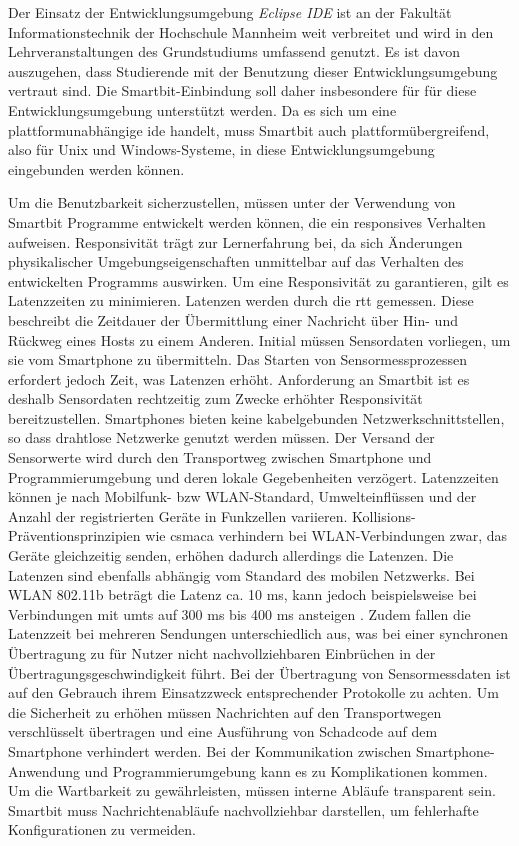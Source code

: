 \documentclass[11pt,a4paper]{report}
\begin{document}
Der Einsatz der Entwicklungsumgebung \textit{Eclipse IDE} \cite{eclipse-ide} ist an der Fakultät Informationstechnik der Hochschule Mannheim weit verbreitet und wird in den Lehrveranstaltungen des Grundstudiums umfassend genutzt.
Es ist davon auszugehen, dass Studierende mit der Benutzung dieser Entwicklungsumgebung vertraut sind.
Die Smartbit-Einbindung soll daher insbesondere für für diese Entwicklungsumgebung unterstützt werden.
Da es sich um eine plattformunabhängige \acrfull{ide} handelt, muss Smartbit auch plattformübergreifend, also für Unix und Windows-Systeme, in diese Entwicklungsumgebung eingebunden werden können.

Um die Benutzbarkeit sicherzustellen, müssen unter der Verwendung von Smartbit Programme entwickelt werden können, die ein responsives Verhalten aufweisen.
Responsivität trägt zur Lernerfahrung bei, da sich Änderungen physikalischer Umgebungseigenschaften unmittelbar auf das Verhalten des entwickelten Programms auswirken.
Um eine Responsivität zu garantieren, gilt es Latenzzeiten zu minimieren.
Latenzen werden durch die \acrfull{rtt} gemessen.
Diese beschreibt die Zeitdauer der Übermittlung einer Nachricht über Hin- und Rückweg eines Hosts zu einem Anderen.
Initial müssen Sensordaten vorliegen, um sie vom Smartphone zu übermitteln.
Das Starten von Sensormessprozessen erfordert jedoch Zeit, was Latenzen erhöht.
Anforderung an Smartbit ist es deshalb Sensordaten rechtzeitig zum Zwecke erhöhter Responsivität bereitzustellen. 
Smartphones bieten keine kabelgebunden Netzwerkschnittstellen, so dass drahtlose Netzwerke genutzt werden müssen.
Der Versand der Sensorwerte wird durch den Transportweg zwischen Smartphone und Programmierumgebung und deren lokale Gegebenheiten verzögert.
Latenzzeiten können je nach Mobilfunk- bzw WLAN-Standard, Umwelteinflüssen und der Anzahl der registrierten Geräte in Funkzellen variieren.
Kollisions-Präventionsprinzipien wie \acrfull{csmaca} verhindern bei WLAN-Verbindungen zwar, das Geräte gleichzeitig senden, erhöhen dadurch allerdings die Latenzen.
Die Latenzen sind ebenfalls abhängig vom Standard des mobilen Netzwerks.
Bei WLAN 802.11b beträgt die Latenz ca. 10 ms, kann jedoch beispielsweise bei Verbindungen mit \acrfull{umts} auf 300 ms bis 400 ms ansteigen \cite{network_latencies}.
Zudem fallen die Latenzzeit bei mehreren Sendungen unterschiedlich aus, was bei einer synchronen Übertragung zu für Nutzer nicht nachvollziehbaren Einbrüchen  in der Übertragungsgeschwindigkeit führt.
Bei der Übertragung von Sensormessdaten ist auf den Gebrauch ihrem Einsatzzweck entsprechender Protokolle zu achten.
Um die Sicherheit zu erhöhen müssen Nachrichten auf den Transportwegen verschlüsselt übertragen und eine Ausführung von Schadcode auf dem Smartphone verhindert werden.
Bei der Kommunikation zwischen Smartphone-Anwendung und Programmierumgebung kann es zu Komplikationen kommen.
Um die Wartbarkeit zu gewährleisten, müssen interne Abläufe transparent sein.
Smartbit muss Nachrichtenabläufe nachvollziehbar darstellen, um fehlerhafte Konfigurationen zu vermeiden.
\end{document}
